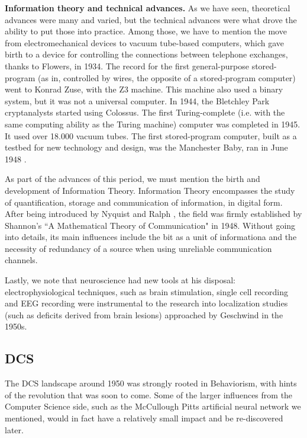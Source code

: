 \documentclass[../main.tex]{subfiles}
\begin{document}
\vspace{4pt}
\textbf{Information theory and technical advances.}
As we have seen, theoretical advances were many and varied, but the technical advances were what drove the ability to put those into practice. Among those, we have to mention the move from electromechanical devices to vacuum tube-based computers, which gave birth to a device for controlling the connections between telephone exchanges, thanks to Flowers, in 1934. The record for the first general-purpose stored-program (as in, controlled by wires, the opposite of a stored-program computer) went to Konrad Zuse, with the Z3 machine. This machine also used a binary system, but it was not a universal computer. In 1944, the Bletchley Park cryptanalysts started using Colossus. The first Turing-complete (i.e. with the same computing ability as the Turing machine) computer was completed in 1945. It used over 18.000 vacuum tubes. The first stored-program computer, built as a testbed for new technology and design, was the Manchester Baby, ran in June 1948 \parencite{ComputerResurrectionIssue2012}.

As part of the advances of this period, we must mention the birth and development of Information Theory. Information Theory encompasses the study of quantification, storage and communication of information, in digital form. After being introduced by Nyquist and Ralph  \parencite{nyquistCertainTopicsTelegraph1928}, the field was firmly established by Shannon's ``A Mathematical Theory of Communication" in 1948. Without going into details, its main influences include the bit as a unit of informationa and the necessity of redundancy of a source when using unreliable communication channels.

Lastly, we note that neuroscience had new tools at his disposal: electrophysiological techniques, such as brain stimulation, single cell recording and EEG recording  \parencite{InternationalEncyclopediaSocial} were instrumental to the research into localization studies (such as deficits derived from brain lesions) approached by Geschwind in the 1950s.

\subsection{DCS}
The DCS landscape around 1950 was strongly rooted in Behaviorism, with hints of the revolution that was soon to come. Some of the larger influences from the Computer Science side, such as the McCullough Pitts artificial neural network we mentioned, would in fact have a relatively small impact and be re-discovered later.
\end{document}
